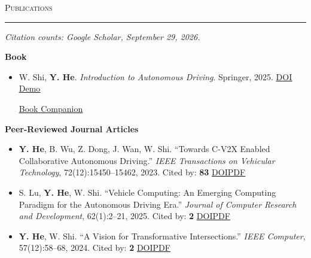\documentclass[11pt]{article}
\let\cvplainhref\href
\renewcommand{\href}[2]{\cvplainhref{#1}{\uline{#2}}}
\newcommand{\cvsection}[1]{%
  \Needspace{5\baselineskip}%
  \vspace{0.62em}%
  {\large\scshape #1}\par
  \vspace{0.12em}\hrule\vspace{0.32em}
}
\newcommand{\cvsubsection}[1]{%
  \Needspace{3\baselineskip}%
  \vspace{0.32em}%
  {\bfseries #1}\par
  \vspace{0.12em}
}
\newcommand{\pubcitation}[1]{%
  \unskip\nobreakspace Cited by: \textbf{#1}%
}
\newcommand{\pubaccepteddoi}[3]{%
  \pubcitation{#1}\nobreakspace\href{#2}{DOI}\nobreakspace\href{#3}{PDF}%
}
\newcommand{\pubresource}[2]{%
  \unskip\space\href{#2}{#1}%
}
\begin{document}
\cvsection{Publications}
{\small\itshape Citation counts: Google Scholar, September 29, 2026.\par}
\cvsubsection{Book}
\begin{itemize}
    \item W. Shi, \textbf{Y. He}. \textit{Introduction to Autonomous Driving}. Springer, 2025. \href{https://doi.org/10.1007/978-3-031-99485-2}{DOI}
    \pubresource{Demo}{https://thecarlab.github.io/AVBook/}
    \pubresource{Book Companion}{https://autonomousdrivingbook.org/book-chapters}
\end{itemize}

\cvsubsection{Peer-Reviewed Journal Articles}
\begin{itemize}
    \item \textbf{Y. He}, B. Wu, Z. Dong, J. Wan, W. Shi. ``Towards C-V2X Enabled Collaborative Autonomous Driving.'' \textit{IEEE Transactions on Vehicular Technology}, 72(12):15450--15462, 2023.\pubaccepteddoi{83}{https://doi.org/10.1109/TVT.2023.3299844}{https://par.nsf.gov/servlets/purl/10467122}
    \item S. Lu, \textbf{Y. He}, W. Shi. ``Vehicle Computing: An Emerging Computing Paradigm for the Autonomous Driving Era.'' \textit{Journal of Computer Research and Development}, 62(1):2--21, 2025.\pubaccepteddoi{2}{https://doi.org/10.7544/issn1000-1239.202440538}{https://crad.ict.ac.cn/cn/article/pdf/preview/10.7544/issn1000-1239.202440538.pdf}
    \item \textbf{Y. He}, W. Shi. ``A Vision for Transformative Intersections.'' \textit{IEEE Computer}, 57(12):58--68, 2024.\pubaccepteddoi{2}{https://doi.org/10.1109/MC.2024.3421963}{https://weisongshi.org/papers/He24-OpenIntersection.pdf}
\end{itemize}
\end{document}
